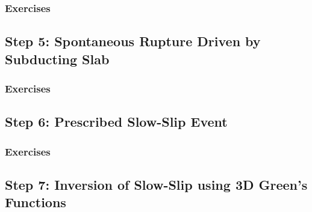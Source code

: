 \subsubsection{Exercises}




\subsection{Step 5: Spontaneous Rupture Driven by Subducting Slab}

\subsubsection{Exercises}

\subsection{Step 6: Prescribed Slow-Slip Event}

\subsubsection{Exercises}


\subsection{Step 7: Inversion of Slow-Slip using 3D Green's Functions}




